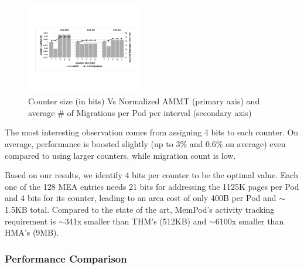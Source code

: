 \begin{figure}[h]
  \includegraphics[width=0.46\textwidth]{figures/counter_size_normalized.pdf}
  \caption{Counter size (in bits) Vs Normalized AMMT (primary axis) and average \# of Migrations per Pod per interval (secondary axis)}
  \label{fig:counter_size}
\end{figure}

The most interesting observation comes from assigning 4 bits to each counter. On average, performance is boosted slightly (up to 3\% and 0.6\% on average) even compared to using larger counters, while migration count is low. %

Based on our results, we identify 4 bits per counter to be the optimal value. Each one of the 128 MEA entries needs 21 bits for addressing the 1125K pages per Pod and 4 bits for its counter, leading to an area cost of only 400B per Pod and $\sim$1.5KB total. Compared to the state of the art, MemPod's activity tracking requirement is $\sim$341x smaller than THM's (512KB) and $\sim$6100x smaller than HMA's (9MB).


\subsubsection{Performance Comparison}
\label{sub:performance}

